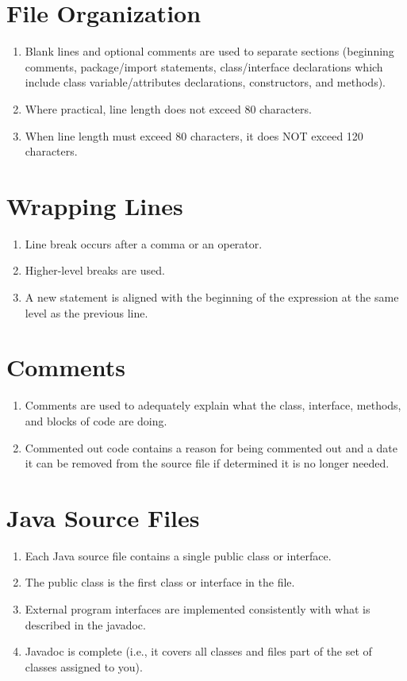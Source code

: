 \section*{File Organization}\begin{enumerate}[resume]
\item Blank lines and optional comments are used to separate sections (beginning comments, package/import statements, class/interface declarations which include class variable/attributes declarations, constructors, and methods).
\item Where practical, line length does not exceed 80 characters.
\item When line length must exceed 80 characters, it does NOT exceed 120 characters.
\end{enumerate}

\section*{Wrapping Lines}\begin{enumerate}[resume]
\item Line break occurs after a comma or an operator.
\item Higher-level breaks are used.
\item A new statement is aligned with the beginning of the expression at the same level as the previous line.
\end{enumerate}

\section*{Comments}\begin{enumerate}[resume]
\item Comments are used to adequately explain what the class, interface, methods, and blocks of code are doing.
\item Commented out code contains a reason for being commented out and a date it can be removed from the source file if determined it is no longer needed.
\end{enumerate}

\section*{Java Source Files}\begin{enumerate}[resume]
\item Each Java source file contains a single public class or interface.
\item The public class is the first class or interface in the file.
\item External program interfaces are implemented consistently with what is described in the javadoc.
\item Javadoc is complete (i.e., it covers all classes and files part of the set of classes assigned to you).
\end{enumerate}

